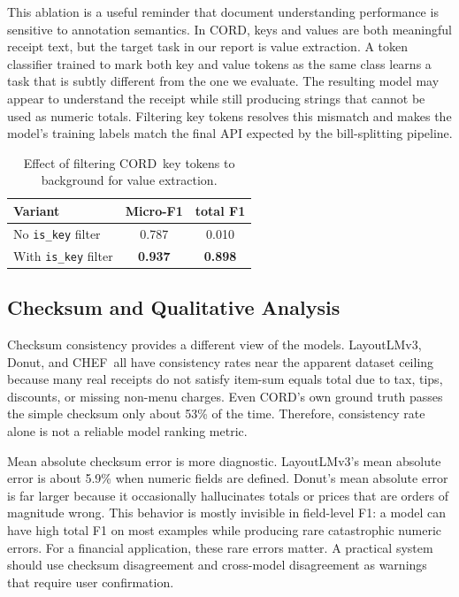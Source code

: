 \documentclass[9pt,twocolumn,twoside]{extarticle}
\newcommand{\cord}{\textsc{CORD}}
\newcommand{\chef}{\textsc{CHEF}}
\begin{document}
This ablation is a useful reminder that document understanding performance is sensitive to annotation semantics. In \cord, keys and values are both meaningful receipt text, but the target task in our report is value extraction. A token classifier trained to mark both key and value tokens as the same class learns a task that is subtly different from the one we evaluate. The resulting model may appear to understand the receipt while still producing strings that cannot be used as numeric totals. Filtering key tokens resolves this mismatch and makes the model's training labels match the final API expected by the bill-splitting pipeline.

\begin{table}[t]
\centering
\caption{Effect of filtering \cord\ key tokens to background for value extraction.}
\label{tab:is-key}
\small
\begin{tabular}{lcc}
\toprule
\textbf{Variant} & \textbf{Micro-F1} & \textbf{total F1} \\
\midrule
No \texttt{is\_key} filter & 0.787 & 0.010 \\
With \texttt{is\_key} filter & \textbf{0.937} & \textbf{0.898} \\
\bottomrule
\end{tabular}
\end{table}

\subsection{Checksum and Qualitative Analysis}
\label{sec:checksum}

Checksum consistency provides a different view of the models. LayoutLMv3, Donut, and \chef\ all have consistency rates near the apparent dataset ceiling because many real receipts do not satisfy item-sum equals total due to tax, tips, discounts, or missing non-menu charges. Even \cord's own ground truth passes the simple checksum only about 53\% of the time. Therefore, consistency rate alone is not a reliable model ranking metric.

Mean absolute checksum error is more diagnostic. LayoutLMv3's mean absolute error is about 5.9\% when numeric fields are defined. Donut's mean absolute error is far larger because it occasionally hallucinates totals or prices that are orders of magnitude wrong. This behavior is mostly invisible in field-level F1: a model can have high total F1 on most examples while producing rare catastrophic numeric errors. For a financial application, these rare errors matter. A practical system should use checksum disagreement and cross-model disagreement as warnings that require user confirmation.
\end{document}
